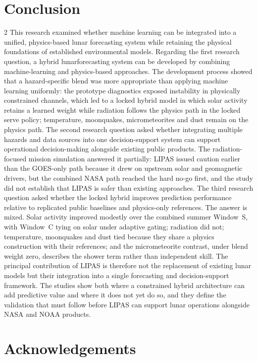 \section{Conclusion}
\begin{multicols}{2}
This research examined whether machine learning can be integrated into a unified, physics-based lunar forecasting system while retaining the physical foundations of established environmental models. Regarding the first research question, a hybrid lunarforecasting system can be developed by combining machine-learning and physics-based approaches. The development process showed that a hazard-specific blend was more appropriate than applying machine learning uniformly: the prototype diagnostics exposed instability in physically constrained channels, which led to a locked hybrid model in which solar activity retains a learned weight while radiation follows the physics path in the locked serve policy; temperature, moonquakes, micrometeorites and dust remain on the physics path. The second research question asked whether integrating multiple hazards and data sources into one decision-support system can support operational decision-making alongside existing public products. The radiation-focused mission simulation answered it partially: LIPAS issued caution earlier than the GOES-only path because it drew on upstream solar and geomagnetic drivers, but the combined NASA path reached the hard no-go first, and the study did not establish that LIPAS is safer than existing approaches. The third research question asked whether the locked hybrid improves prediction performance relative to replicated public baselines and physics-only references. The answer is mixed. Solar activity improved modestly over the combined summer Window~S, with Window~C tying on solar under adaptive gating; radiation did not; temperature, moonquakes and dust tied because they share a physics construction with their references; and the micrometeorite contrast, under blend weight zero, describes the shower term rather than independent skill. The principal contribution of LIPAS is therefore not the replacement of existing lunar models but their integration into a single forecasting and decision-support framework. The studies show both where a constrained hybrid architecture can add predictive value and where it does not yet do so, and they define the validation that must follow before LIPAS can support lunar operations alongside NASA and NOAA products.

\section*{Acknowledgements}


\end{multicols}
